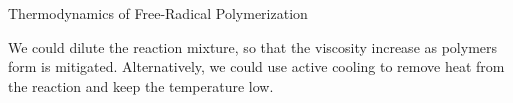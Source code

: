 \begin{activity}{Thermodynamics of Free-Radical Polymerization}
\begin{ctqs}
		\begin{solution}[2in]
			We could dilute the reaction mixture, so that the viscosity increase as polymers form is mitigated.  Alternatively, we could use active cooling to remove heat from the reaction and keep the temperature low.
		\end{solution}

\end{ctqs}


	


%
%	


	
\end{activity}